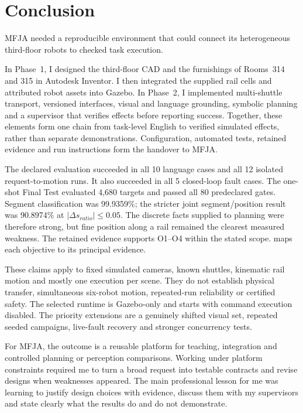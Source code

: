 \chapter{Conclusion}
\label{chap:conclusion}

MFJA needed a reproducible environment that could connect its heterogeneous
third-floor robots to checked task execution.

In Phase~1, I designed the third-floor CAD and the furnishings of Rooms~314 and
315 in Autodesk Inventor. I then integrated the supplied rail cells and
attributed robot assets into Gazebo. In Phase~2, I implemented multi-shuttle
transport, versioned interfaces, visual and language grounding, symbolic
planning and a supervisor that verifies effects before reporting success.
Together, these elements form one chain from task-level English to verified
simulated effects, rather than separate demonstrations. Configuration,
automated tests, retained evidence and run instructions form the handover to
MFJA.

The declared evaluation succeeded in all 10 language cases and all 12 isolated
request-to-motion runs. It also succeeded in all 5 closed-loop fault cases. The
one-shot Final Test evaluated 4,680 targets and passed all 80 predeclared gates.
Segment classification was 99.9359\%; the stricter joint segment/position result
was 90.8974\% at $|\Delta s_{ratio}|\leq0.05$. The discrete facts supplied to
planning were therefore strong, but fine position along a rail remained the
clearest measured weakness. The retained evidence supports O1--O4 within the
stated scope.  maps each objective to its principal
evidence.

These claims apply to fixed simulated cameras, known shuttles, kinematic rail
motion and mostly one execution per scene. They do not establish physical
transfer, simultaneous six-robot motion, repeated-run reliability or certified
safety. The selected runtime is Gazebo-only and starts with command execution
disabled. The priority extensions are a genuinely shifted visual set, repeated
seeded campaigns, live-fault recovery and stronger concurrency tests.

For MFJA, the outcome is a reusable platform for teaching, integration and
controlled planning or perception comparisons. Working under platform
constraints required me to turn a broad request into testable contracts and
revise designs when weaknesses appeared. The main professional lesson for me
was learning to justify design choices with evidence, discuss them with my
supervisors and state clearly what the results do and do not demonstrate.
